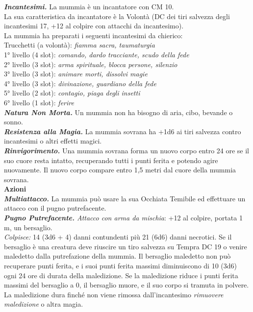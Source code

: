 \begin{multicols}{2}
\emph{\textbf{Incantesimi.}} La mummia è un incantatore con CM 10.\\
La sua caratteristica da incantatore è la Volontà (DC dei tiri salvezza degli incantesimi 17, +12 al colpire con attacchi da incantesimo).\\
La mummia ha preparati i seguenti incantesimi da chierico:\\
Trucchetti (a volontà): \emph{fiamma sacra, taumaturgia}\\
1° livello (4 slot): \emph{comando, dardo tracciante, scudo della fede}\\
2° livello (3 slot): \emph{arma spirituale, blocca persone, silenzio}\\
3° livello (3 slot): \emph{animare morti, dissolvi magie}\\
4° livello (3 slot): \emph{divinazione, guardiano della fede}\\
5° livello (2 slot): \emph{contagio, piaga degli insetti}\\
6° livello (1 slot): \emph{ferire}\\
\emph{\textbf{Natura Non Morta.}} Un mummia non ha bisogno di aria, cibo, bevande o sonno.\\
\emph{\textbf{Resistenza alla Magia.}} La mummia sovrana ha +1d6 ai tiri salvezza contro incantesimi o altri effetti magici.\\
\emph{\textbf{Rinvigorimento.}} Una mummia sovrana forma un nuovo corpo entro 24 ore se il suo cuore resta intatto, recuperando tutti i punti ferita e potendo agire nuovamente. Il nuovo corpo compare entro 1,5 metri dal cuore della mummia sovrana.\\
\smallskip\textbf{Azioni}\\
\emph{\textbf{Multiattacco.}} La mummia può usare la sua Occhiata Temibile ed effettuare un attacco con il pugno putrefacente.\\
\emph{\textbf{Pugno Putrefacente.} Attacco con arma da mischia}: +12 al colpire, portata 1 m, un bersaglio.\\
\emph{Colpisce:} 14 (3d6 + 4) danni contundenti più 21 (6d6) danni necrotici. Se il bersaglio è una creatura deve riuscire un tiro salvezza su Tempra DC  19 o venire maledetto dalla putrefazione della mummia. Il bersaglio maledetto non può recuperare punti ferita, e i suoi punti ferita massimi diminuiscono di 10 (3d6) ogni 24 ore di durata della maledizione. Se la maledizione riduce i punti ferita massimi del bersaglio a 0, il bersaglio muore, e il suo corpo si tramuta in polvere. La maledizione dura finché non viene rimossa dall'incantesimo \emph{rimuovere maledizione} o altra magia.\\


\end{multicols}

